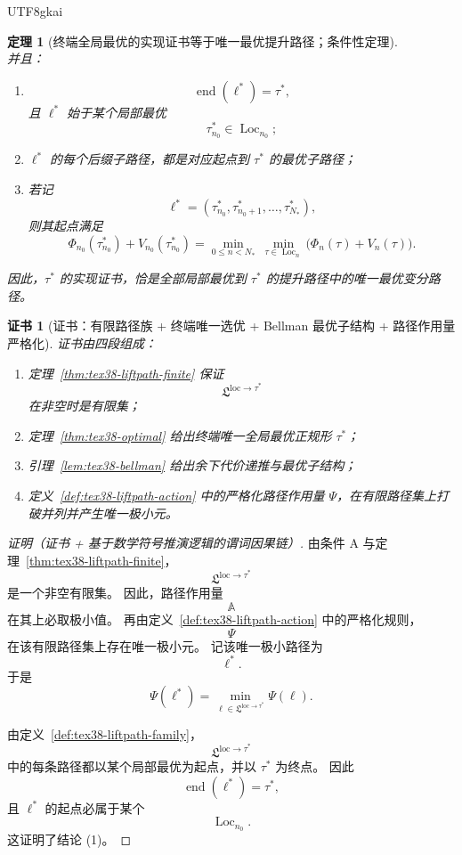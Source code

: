 \documentclass[12pt]{article}
\newtheorem{theorem}{定理}[section]
\newtheorem{Certificate}{证书}[section]
\begin{document}
\begin{CJK*}{UTF8}{gkai}
\begin{theorem}[终端全局最优的实现证书等于唯一最优提升路径；条件性定理]
\[\]
并且：
\begin{enumerate}
  \item
  \[
    \operatorname{end}(\ell^\ast)=\tau^\ast,
  \]
  且 $\ell^\ast$ 始于某个局部最优
  \[
    \tau_{n_0}^\ast\in\operatorname{Loc}_{n_0};
  \]
  \item $\ell^\ast$ 的每个后缀子路径，都是对应起点到 $\tau^\ast$ 的最优子路径；
  \item 若记
  \[
    \ell^\ast=(\tau_{n_0}^\ast,\tau_{n_0+1}^\ast,\dots,\tau_{N_\ast}^\ast),
  \]
  则其起点满足
  \[
    \Phi_{n_0}(\tau_{n_0}^\ast)+V_{n_0}(\tau_{n_0}^\ast)
    =
    \min_{0\le n<N_\ast}\ \min_{\tau\in\operatorname{Loc}_n}
    \bigl(\Phi_n(\tau)+V_n(\tau)\bigr).
  \]
\end{enumerate}
因此，$\tau^\ast$ 的实现证书，恰是全部局部最优到 $\tau^\ast$ 的提升路径中的唯一最优变分路径。
\end{theorem}

\begin{Certificate}[证书：有限路径族 + 终端唯一选优 + Bellman 最优子结构 + 路径作用量严格化]
\label{cert:tex38-liftpath-optimal}
证书由四段组成：
\begin{enumerate}
  \item 定理~\ref{thm:tex38-liftpath-finite} 保证
  \[
    \mathfrak L^{\mathrm{loc}\to\tau^\ast}
  \]
  在非空时是有限集；
  \item 定理~\ref{thm:tex38-optimal} 给出终端唯一全局最优正规形 $\tau^\ast$；
  \item 引理~\ref{lem:tex38-bellman} 给出余下代价递推与最优子结构；
  \item 定义~\ref{def:tex38-liftpath-action} 中的严格化路径作用量 $\Psi$，在有限路径集上打破并列并产生唯一极小元。
\end{enumerate}
\end{Certificate}

\begin{proof}[证明（证书 + 基于数学符号推演逻辑的谓词因果链）]
由条件 A 与定理~\ref{thm:tex38-liftpath-finite}，
\[
  \mathfrak L^{\mathrm{loc}\to\tau^\ast}
\]
是一个非空有限集。
因此，路径作用量
\[
  \mathbb A
\]
在其上必取极小值。
再由定义~\ref{def:tex38-liftpath-action} 中的严格化规则，
\[
  \Psi
\]
在该有限路径集上存在唯一极小元。
记该唯一极小路径为
\[
  \ell^\ast.
\]
于是
\[
  \Psi(\ell^\ast)
  =
  \min_{\ell\in\mathfrak L^{\mathrm{loc}\to\tau^\ast}}
  \Psi(\ell).
\]

由定义~\ref{def:tex38-liftpath-family}，
\[
  \mathfrak L^{\mathrm{loc}\to\tau^\ast}
\]
中的每条路径都以某个局部最优为起点，并以 $\tau^\ast$ 为终点。
因此
\[
  \operatorname{end}(\ell^\ast)=\tau^\ast,
\]
且 $\ell^\ast$ 的起点必属于某个
\[
  \operatorname{Loc}_{n_0}.
\]
这证明了结论 (1)。


\end{proof}
\end{CJK*}
\end{document}
